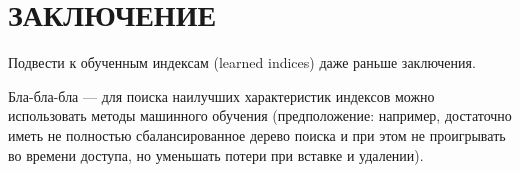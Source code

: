 \chapter*{ЗАКЛЮЧЕНИЕ}

Подвести к обученным индексам (learned indices) даже раньше заключения.

Бла-бла-бла --- для поиска наилучших характеристик индексов можно использовать
методы машинного обучения (предположение: например, достаточно иметь не
полностью сбалансированное дерево поиска и при этом не проигрывать во времени
доступа, но уменьшать потери при вставке и удалении).


